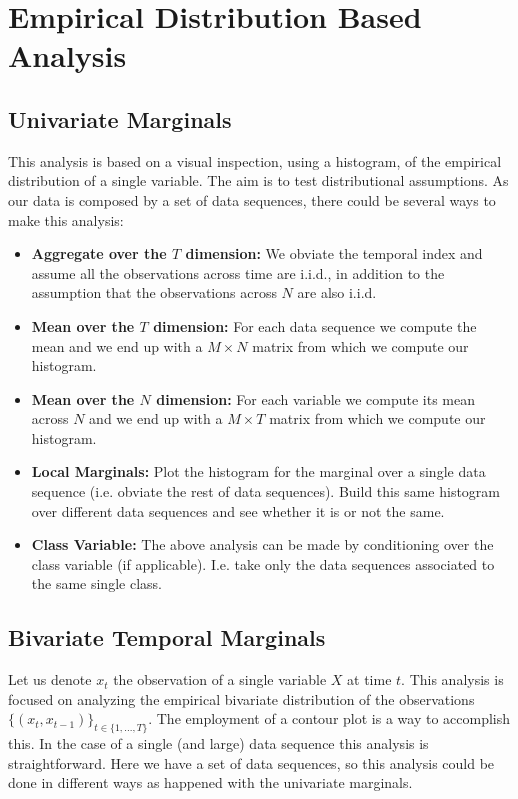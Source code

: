 \documentclass[12pt,a4paper,twopages]{article}
\begin{document}
\section{Empirical Distribution Based Analysis}

\subsection{Univariate Marginals}
This analysis is based on a visual inspection, using a histogram, of the empirical distribution of a single variable. The aim is to
test distributional assumptions. As our data is composed by a set of data sequences, there could be several ways to make this analysis:

\begin{itemize}

\item \textbf{Aggregate over the $T$ dimension:} We obviate the temporal index and assume all the observations across time are i.i.d., in addition 
to the assumption that the observations across $N$ are also i.i.d. 

\item \textbf{Mean over the $T$ dimension:}  For each data sequence we compute the mean and we end up with a $M\times N$ matrix from which
we compute our histogram. 

\item \textbf{Mean over the $N$ dimension:} For each variable we compute its mean across $N$ and we end up with a $M\times T$ matrix from which we compute our histogram. 

\item \textbf{Local Marginals:}  Plot the histogram for the marginal over a single data sequence (i.e. obviate the rest of data sequences). Build this same histogram over different  data sequences and see whether it is or not the same. 

\item \textbf{Class Variable:} The above analysis can be made by conditioning over the class variable (if applicable). I.e. take only the data sequences associated to the same single class. 
\end{itemize}


\subsection{Bivariate Temporal Marginals}
Let us denote $x_t$ the observation of a single variable $X$ at time $t$. This analysis is focused on analyzing the empirical bivariate distribution of the observations $\{(x_t, x_{t-1})\}_{t\in\{1,...,T\}}$. The employment of a contour plot is a way to accomplish this. In the case of a single (and large) data sequence this analysis is straightforward. Here we have a set of data sequences, so this analysis could be done in different ways as happened with the univariate marginals.
\end{document}
